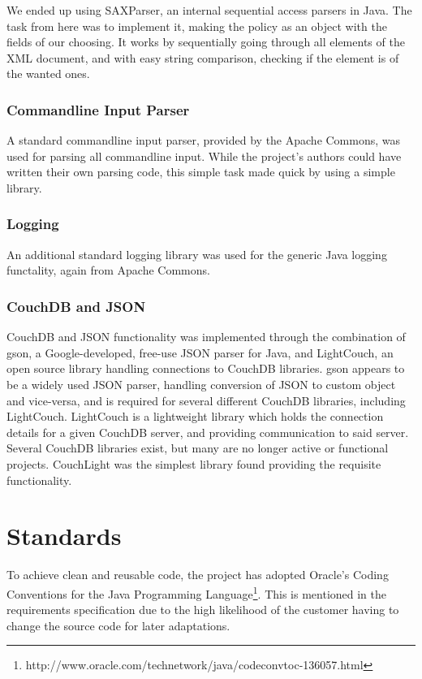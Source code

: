 We ended up using SAXParser, an internal sequential access parsers in Java. The task from here was to implement it, making the policy as an object with the fields of our choosing. It works by sequentially going through all elements of the XML document, and with easy string comparison, checking if the element is of the wanted ones.

\subsubsection{Commandline Input Parser}
A standard commandline input parser, provided by the Apache Commons, was used for parsing all commandline input. While the project's authors could have written their own parsing code, this simple task made quick by using a simple library.

\subsubsection{Logging}
An additional standard logging library was used for the generic Java logging functality, again from Apache Commons.

\subsubsection{CouchDB and JSON}
CouchDB and JSON functionality was implemented through the combination of gson, a Google-developed, free-use JSON parser for Java, and LightCouch, an open source library handling connections to CouchDB libraries.
gson appears to be a widely used JSON parser, handling conversion of JSON to custom object and vice-versa, and is required for several different CouchDB libraries, including LightCouch.
LightCouch is a lightweight library which holds the connection details for a given CouchDB server, and providing communication to said server. Several CouchDB libraries exist, but many are no longer active or functional projects. CouchLight was the simplest library found providing the requisite functionality.

\section{Standards}
To achieve clean and reusable code, the project has adopted Oracle's Coding Conventions for the Java Programming Language\footnote{http://www.oracle.com/technetwork/java/codeconvtoc-136057.html}. This is mentioned in the requirements specification due to the high likelihood of the customer having to change the source code for later adaptations.




